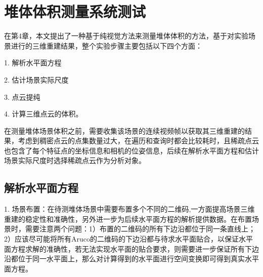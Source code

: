 \section{堆体体积测量系统测试}
\label{sec:5.4}
在第4章，本文提出了一种基于纯视觉方法来测量堆体体积的方法，基于对实验场景进行的三维重建结果，整个实验步骤主要包括以下四个方面：

1. 解析水平面方程

2. 估计场景实际尺度

3. 点云提纯

4. 计算三维点云的体积。

在测量堆体场景体积之前，需要收集该场景的连续视频帧以获取其三维重建的结果，考虑到稠密点云的点集数量过大，在遍历和查询时都会比较耗时，且稀疏点云也包含了每个特征点的坐标信息和相机的位姿信息，后续在解析水平面方程和估计场景实际尺度时选择稀疏点云作为分析对象。

\subsection{解析水平面方程}
\label{sec:5.4.1}
1. 场景布置：在待测堆体场景中需要布置多个不同的二维码,一方面提高场景三维重建的稳定性和准确性，另外进一步为后续水平面方程的解析提供数据。在布置场景时，需要注意两个问题：1）布置的二维码的所有下边沿都位于同一条直线上；2）应该尽可能将所有Aruco的二维码的下边沿都与待求水平面贴合，以保证水平面方程求解的准确性，若无法实现水平面的贴合要求，则需要进一步保证所有下边沿都位于同一水平面上，那么对计算得到的水平面进行空间变换即可得到真实水平面方程。

